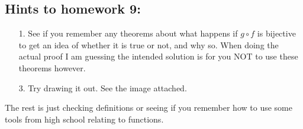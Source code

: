 \documentclass[letterpaper,12pt]{article}
\begin{document}
\subsection*{Hints to homework 9:}
\begin{enumerate}
\item[1.] See if you remember any theorems about what happens if $g \circ f$ is bijective to get an idea of whether it is true or not, and why so. When doing the actual proof I am guessing the intended solution is for you NOT to use these theorems however.
\item[3.] Try drawing it out. See the image attached.
\end{enumerate}
The rest is just checking definitions or seeing if you remember how to use some tools from high school relating to functions.
\end{document}
